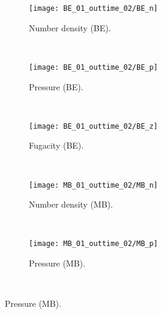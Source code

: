 \documentclass{rsproca}%
\begin{document}
\begin{figure}
        \centering
        \begin{subfigure}[b]{0.32\textwidth}
                \centering
                \texttt{[image: BE\_01\_outtime\_02/BE\_n]}
                \caption{Number density (BE).}
                \label{fig:5ESBGK_BE_n_tau01}
        \end{subfigure}%
        ~ %
        \begin{subfigure}[b]{0.32\textwidth}
                \centering
                \texttt{[image: BE\_01\_outtime\_02/BE\_p]}
                \caption{Pressure (BE).}
                \label{fig:5ESBGK_BE_p_tau01}
        \end{subfigure}
        ~ %
        \begin{subfigure}[b]{0.32\textwidth}
                \centering
                \texttt{[image: BE\_01\_outtime\_02/BE\_z]}
                \caption{Fugacity (BE).}
                \label{fig:5ESBGK_BE_z_tau01}
        \end{subfigure}
				~ %
        \begin{subfigure}[b]{0.32\textwidth}
                \centering
                \texttt{[image: MB\_01\_outtime\_02/MB\_n]}
                \caption{Number density (MB).}
                \label{fig:5ESBGK_MB_n_tau01}
        \end{subfigure}
        ~ %
        \begin{subfigure}[b]{0.32\textwidth}
                \centering
                \texttt{[image: MB\_01\_outtime\_02/MB\_p]}
                \caption{Pressure (MB). }
                \label{fig:5ESBGK_MB_p_tau01}
        \end{subfigure}
				~ %

\end{figure}
\end{document}
